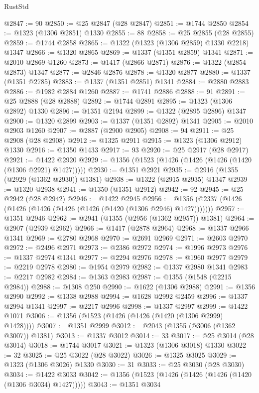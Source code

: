 \begin{lexlean}{RustStd}
\begin{coremodule}
@2847 := 90
@2850 := @25 @2847 (@28 @2847)
@2851 := @1744 @2850
@2854 := @1323 (@1306 @2851) @1330
@2855 := 88
@2858 := @25 @2855 (@28 @2855)
@2859 := @1744 @2858
@2865 := @1322 (@1323 (@1306 @2859) @1330 @2218) @1347
@2866 := @1320 @2865
@2869 := @1337 (@1351 @2859) @1341
@2871 := @2010 @2869 @1260
@2873 := @1417 (@2866 @2871)
@2876 := @1322 (@2854 @2873) @1347
@2877 := @2846 @2876
@2878 := @1320 @2877
@2880 := @1337 (@1351 @2785)
@2883 := @1337 (@1351 @2851) @1341
@2884 := @2880 @2883
@2886 := @1982 @2884 @1260
@2887 := @1741 @2886
@2888 := 91
@2891 := @25 @2888 (@28 @2888)
@2892 := @1744 @2891
@2895 := @1323 (@1306 @2892) @1330
@2896 := @1351 @2194
@2899 := @1322 (@2895 @2896) @1347
@2900 := @1320 @2899
@2903 := @1337 (@1351 @2892) @1341
@2905 := @2010 @2903 @1260
@2907 := @2887 (@2900 @2905)
@2908 := 94
@2911 := @25 @2908 (@28 @2908)
@2912 := @1325 @2911
@2915 := @1323 (@1306 @2912) @1330
@2916 := @1350 @1433
@2917 := 93
@2920 := @25 @2917 (@28 @2917)
@2921 := @1422 @2920
@2929 := @1356 (@1523 (@1426 (@1426 (@1426 (@1420 (@1306 @2921) @1427)))))
@2930 := @1351 @2921
@2935 := @2916 (@1355 (@2929 (@1362 @2930)) @1381)
@2938 := @1322 (@2915 @2935) @1347
@2939 := @1320 @2938
@2941 := @1350 (@1351 @2912)
@2942 := 92
@2945 := @25 @2942 (@28 @2942)
@2946 := @1422 @2945
@2956 := @1356 (@2337 (@1426 (@1426 (@1426 (@1426 (@1426 (@1420 (@1306 @2946) @1427)))))))
@2957 := @1351 @2946
@2962 := @2941 (@1355 (@2956 (@1362 @2957)) @1381)
@2964 := @2907 (@2939 @2962)
@2966 := @1417 (@2878 @2964)
@2968 := @1337 @2966 @1341
@2969 := @2780 @2968
@2970 := @2691 @2969
@2971 := @2603 @2970
@2972 := @2496 @2971
@2973 := @2386 @2972
@2974 := @1996 @2973
@2976 := @1337 @2974 @1341
@2977 := @2294 @2976
@2978 := @1960 @2977
@2979 := @2219 @2978
@2980 := @1954 @2979
@2982 := @1337 @2980 @1341
@2983 := @2217 @2982
@2984 := @1363 @2983
@2987 := @1355 (@1548 (@2215 @2984))
@2988 := @1308 @250
@2990 := @1622 (@1306 @2988)
@2991 := @1356 @2990
@2992 := @1338 @2988
@2994 := @1628 @2992 @2459
@2996 := @1337 @2994 @1341
@2997 := @2217 @2996
@2998 := @1337 @2997
@2999 := @1422 @1071
@3006 := @1356 (@1523 (@1426 (@1426 (@1420 (@1306 @2999) @1428))))
@3007 := @1351 @2999
@3012 := @2043 (@1355 (@3006 (@1362 @3007)) @1381)
@3013 := @1337 @3012
@3014 := 33
@3017 := @25 @3014 (@28 @3014)
@3018 := @1744 @3017
@3021 := @1323 (@1306 @3018) @1330
@3022 := 32
@3025 := @25 @3022 (@28 @3022)
@3026 := @1325 @3025
@3029 := @1323 (@1306 @3026) @1330
@3030 := 31
@3033 := @25 @3030 (@28 @3030)
@3034 := @1422 @3033
@3042 := @1356 (@1523 (@1426 (@1426 (@1426 (@1420 (@1306 @3034) @1427)))))
@3043 := @1351 @3034

\end{coremodule}
\end{lexlean}

